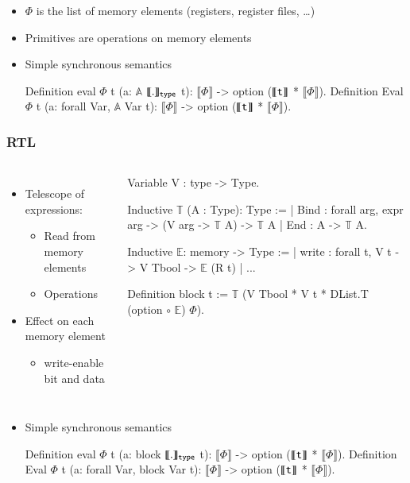 \documentclass[9pt]{beamer}
\newcommand\denote[1]{\llbracket #1 \rrbracket}
\begin{document}
\begin{frame}[fragile]
\begin{itemize}
\item $\Phi$ is the list of memory elements (registers, register files, \dots)
\item Primitives are operations on memory elements
\item Simple synchronous semantics 
  \begin{coq}
Definition eval $\Phi$ t (a: $\mathbb A$ $\denote{.}_{\tt type}$ t): $\denote\Phi$ -> option ($\denote{\tt t}$ * $\denote\Phi$).
Definition Eval $\Phi$ t (a: forall Var, $\mathbb A$ Var t): $\denote\Phi$ -> option ($\denote{\tt t}$ * $\denote\Phi$).
\end{coq}
\end{itemize}

\end{frame}
\begin{frame}[fragile]
  \frametitle{RTL}
  \begin{columns}
    \begin{itemize}
    \item Telescope of expressions:
      \begin{itemize}
      \item Read from memory elements 
      \item Operations 
      \end{itemize}
    \item Effect on each memory element
      \begin{itemize}
      \item write-enable bit and data
      \end{itemize}
    \end{itemize}
    \begin{coq}
Variable V : type -> Type.       

Inductive $\mathbb T$ (A : Type): Type :=
| Bind : forall arg, expr arg -> (V arg -> $\mathbb T$ A) -> $\mathbb T$ A
| End : A -> $\mathbb T$ A.

Inductive $\mathbb E$: memory -> Type :=
| write : forall t,  V t -> V Tbool -> $\mathbb E$ (R t)
| ...

Definition block t :=
  $\mathbb T$ (V Tbool  * V t  * DList.T (option $\circ$ $\mathbb E$) $\Phi$). 
\end{coq}
  \end{columns}


\begin{itemize}
\item Simple synchronous semantics 
  \begin{coq}
Definition eval $\Phi$ t (a: block $\denote{.}_{\tt type}$ t): $\denote\Phi$ -> option ($\denote{\tt t}$ * $\denote\Phi$).
Definition Eval $\Phi$ t (a: forall Var, block Var t): $\denote\Phi$ -> option ($\denote{\tt t}$ * $\denote\Phi$).
\end{coq}
\end{itemize} 
\end{frame}
\end{document}
